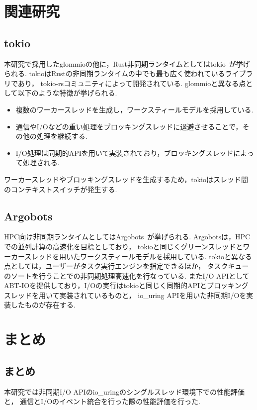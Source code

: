 \documentclass[a4paper,11pt]{jreport}
\begin{document}
\chapter{関連研究}
\section{tokio}
本研究で採用したglommioの他に，Rust非同期ランタイムとしてはtokio~\cite{tokio}が挙げられる.
tokioはRustの非同期ランタイムの中でも最も広く使われているライブラリであり，
tokio-rsコミュニティによって開発されている.
glommioと異なる点として以下のような特徴が挙げられる.

\begin{itemize}
	\item 複数のワーカースレッドを生成し，ワークスティールモデルを採用している.
	\item 通信やI/Oなどの重い処理をブロッキングスレッドに退避させることで，その他の処理を継続する.
	\item I/O処理は同期的APIを用いて実装されており，ブロッキングスレッドによって処理される.
\end{itemize}

ワーカースレッドやブロッキングスレッドを生成するため，tokioはスレッド間のコンテキストスイッチが発生する.

\section{Argobots}
HPC向け非同期ランタイムとしてはArgobots~\cite{argobots}が挙げられる.
Argobotsは，HPCでの並列計算の高速化を目標としており，
tokioと同じくグリーンスレッドとワーカースレッドを用いたワークスティールモデルを採用している.
tokioと異なる点としては，ユーザーがタスク実行エンジンを指定できるほか，
タスクキューのソートを行うことでの非同期処理高速化を行なっている.
またI/O APIとしてABT-IOを提供しており，I/Oの実行はtokioと同じく同期的APIとブロッキングスレッドを用いて実装されているものと，
io\_uring APIを用いた非同期I/Oを実装したものが存在する.


\chapter{まとめ}
\section{まとめ}
本研究では非同期I/O APIのio\_uringのシングルスレッド環境下での性能評価と，
通信とI/Oのイベント統合を行った際の性能評価を行った.
\end{document}

